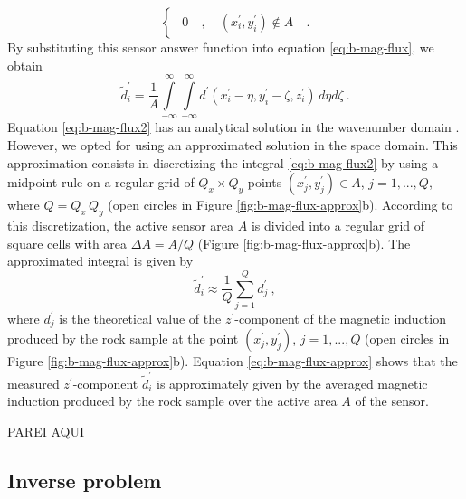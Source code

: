\documentclass[galley,gc]{agutex}
\begin{document}
\begin{article}
\begin{equation}
\begin{cases}
\begin{split}
0 &\: , \quad (x^{\prime}_{i}, y^{\prime}_{i}) \notin A
\end{split}
\end{cases} \: .
\label{eq:w-function}
\end{equation}
By substituting this sensor answer function into 
equation \ref{eq:b-mag-flux}, we obtain
\begin{equation}
\tilde{d}^{\prime}_{i} = \frac{1}{A} 
\int \limits_{-\infty}^{\infty} \int \limits_{-\infty}^{\infty}
d^{\prime}(x^{\prime}_{i} - \eta, y^{\prime}_{i} - \zeta, z^{\prime}_{i}) \, d\eta d\zeta \: .
\label{eq:b-mag-flux2}
\end{equation}
Equation \ref{eq:b-mag-flux2} has an analytical solution
in the wavenumber domain \citep{egli2000}.
However, we opted for using an approximated solution in the
space domain. This approximation consists in discretizing the 
integral \ref{eq:b-mag-flux2} by using a midpoint rule on 
a regular grid of $Q_{x} \times Q_{y}$ points 
$(x^{\prime}_{j}, y^{\prime}_{j}) \in A$,
$j = 1, ..., Q$, where $Q = Q_{x} \, Q_{y}$
(open circles in Figure \ref{fig:b-mag-flux-approx}b).
According to this discretization, the active sensor area $A$ is
divided into a regular grid of square cells with area
$\Delta A = A/Q$ (Figure \ref{fig:b-mag-flux-approx}b).
The approximated integral is given by
\begin{equation}
\tilde{d}^{\prime}_{i} \approx \frac{1}{Q} \sum \limits_{j = 1}^{Q} d^{\prime}_{j} \: ,
\label{eq:b-mag-flux-approx}
\end{equation}
where $d^{\prime}_{j}$ is the theoretical value of the 
$z^{\prime}$-component of the magnetic induction produced by the rock
sample at the point $(x^{\prime}_{j}, y^{\prime}_{j})$, $j = 1, ..., Q$
(open circles in Figure \ref{fig:b-mag-flux-approx}b).
Equation \ref{eq:b-mag-flux-approx} shows that the measured
$z^{\prime}$-component $\tilde{d}^{\prime}_{i}$ is
approximately given by the averaged magnetic induction
produced by the rock sample over the active area $A$ of the sensor.

PAREI AQUI

\subsection{Inverse problem}
\label{subsec:Inverse problem}


\end{article}
\end{document}
